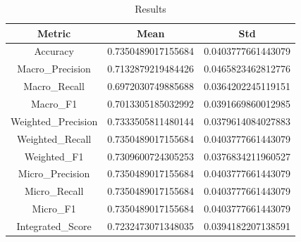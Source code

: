 \begin{table}[htbp]
\centering
\caption{Results}
\label{tab:csv}
\small
\setlength{\tabcolsep}{4pt}
\begin{tabular}{|c|c|c|}
\hline
Metric & Mean & Std \\
\hline
Accuracy & 0.7350489017155684 & 0.0403777661443079 \\
Macro_Precision & 0.7132879219484426 & 0.0465823462812776 \\
Macro_Recall & 0.6972030749885688 & 0.0364202245119151 \\
Macro_F1 & 0.7013305185032992 & 0.0391669860012985 \\
Weighted_Precision & 0.7333505811480144 & 0.0379614084027883 \\
Weighted_Recall & 0.7350489017155684 & 0.0403777661443079 \\
Weighted_F1 & 0.7309600724305253 & 0.0376834211960527 \\
Micro_Precision & 0.7350489017155684 & 0.0403777661443079 \\
Micro_Recall & 0.7350489017155684 & 0.0403777661443079 \\
Micro_F1 & 0.7350489017155684 & 0.0403777661443079 \\
Integrated_Score & 0.7232473071348035 & 0.0394182207138591 \\
\hline
\end{tabular}
\end{table}